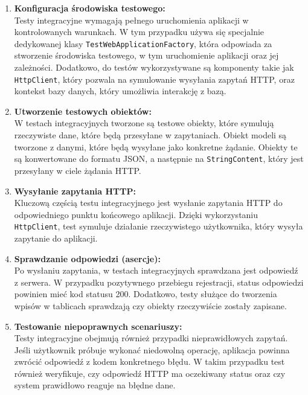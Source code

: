 \documentclass[twoside]{projektInzynierskiMS1}
\begin{document}
\begin{enumerate}
    \item \textbf{Konfiguracja środowiska testowego:}\\
    Testy integracyjne wymagają pełnego uruchomienia aplikacji w kontrolowanych warunkach. W tym przypadku używa się specjalnie dedykowanej klasy \texttt{TestWebApplicationFactory}, która odpowiada za stworzenie środowiska testowego, w tym uruchomienie aplikacji oraz jej zależności. Dodatkowo, do testów wykorzystywane są komponenty takie jak \texttt{HttpClient}, który pozwala na symulowanie wysyłania zapytań HTTP, oraz kontekst bazy danych, który umożliwia interakcję z bazą.

    \item \textbf{Utworzenie testowych obiektów:}\\
    W testach integracyjnych tworzone są testowe obiekty, które symulują rzeczywiste dane, które będą przesyłane w zapytaniach. Obiekt modeli są tworzone z danymi, które będą wysyłane jako konkretne żądanie. Obiekty te są konwertowane do formatu JSON, a następnie na \texttt{StringContent}, który jest przesyłany w ciele żądania HTTP.

    \item \textbf{Wysyłanie zapytania HTTP:}\\
    Kluczową częścią testu integracyjnego jest wysłanie zapytania HTTP do odpowiedniego punktu końcowego aplikacji. Dzięki wykorzystaniu \texttt{HttpClient}, test symuluje działanie rzeczywistego użytkownika, który wysyła zapytanie do aplikacji.

    \item \textbf{Sprawdzanie odpowiedzi (asercje):}\\
    Po wysłaniu zapytania, w testach integracyjnych sprawdzana jest odpowiedź z serwera. W przypadku pozytywnego przebiegu rejestracji, status odpowiedzi powinien mieć kod statusu 200. Dodatkowo, testy służące do tworzenia wpisów w tablicach sprawdzają czy obiekty rzeczywiście zostały zapisane.

    \item \textbf{Testowanie niepoprawnych scenariuszy:}\\
    Testy integracyjne obejmują również przypadki nieprawidłowych zapytań. Jeśli użytkownik próbuje wykonać niedowolną operację, aplikacja powinna zwrócić odpowiedź z kodem konkretnego błędu. W takim przypadku test również weryfikuje, czy odpowiedź HTTP ma oczekiwany status oraz czy system prawidłowo reaguje na błędne dane.

\end{enumerate}
\end{document}
